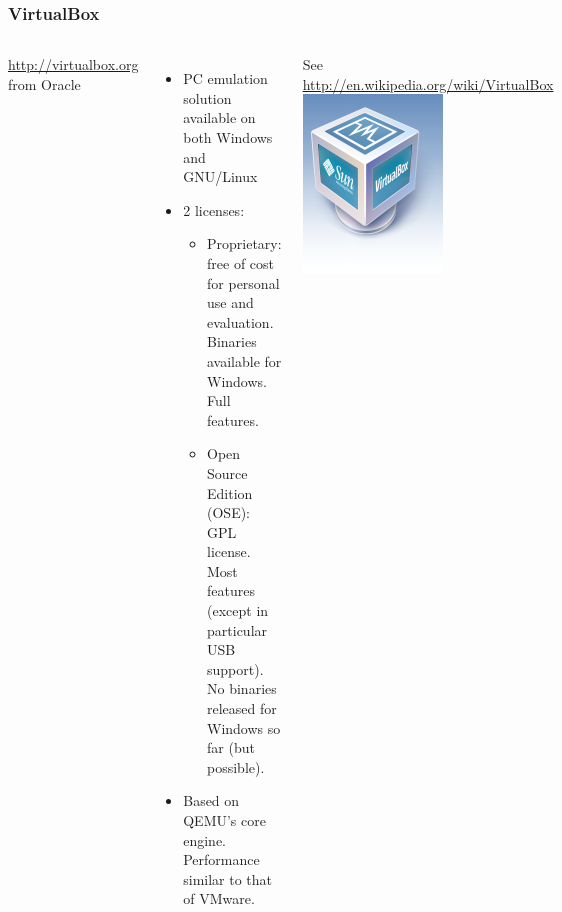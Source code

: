 \begin{frame}
  \frametitle{VirtualBox}
  \begin{columns}[T]
    \url{http://virtualbox.org} from Oracle
    \begin{itemize}
    \item PC emulation solution available on both Windows and GNU/Linux
    \item 2 licenses:
      \begin{itemize}
      \item Proprietary: free of cost for personal use and evaluation.\\
        Binaries available for Windows. Full features.
      \item Open Source Edition (OSE): GPL license.\\
        Most features (except in particular USB support).\\
        No binaries released for Windows so far (but possible).
      \end{itemize}
    \item Based on QEMU's core engine. Performance similar to that of
      VMware.
    \end{itemize}
    See \url{http://en.wikipedia.org/wiki/VirtualBox}
    \includegraphics[width=\textwidth]{slides/sysdev-application-development/virtualbox.png}
  \end{columns}
\end{frame}
